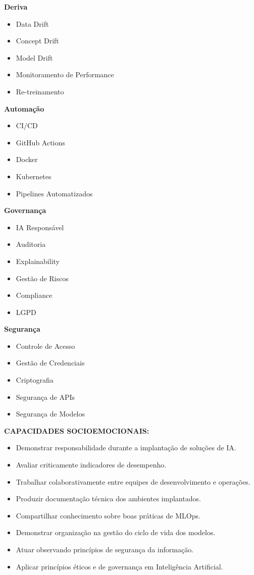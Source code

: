 \textbf{Deriva}

\begin{itemize}
\item Data Drift
\item Concept Drift
\item Model Drift
\item Monitoramento de Performance
\item Re-treinamento
\end{itemize}

\textbf{Automação}

\begin{itemize}
\item CI/CD
\item GitHub Actions
\item Docker
\item Kubernetes
\item Pipelines Automatizados
\end{itemize}

\textbf{Governança}

\begin{itemize}
\item IA Responsável
\item Auditoria
\item Explainability
\item Gestão de Riscos
\item Compliance
\item LGPD
\end{itemize}

\textbf{Segurança}

\begin{itemize}
\item Controle de Acesso
\item Gestão de Credenciais
\item Criptografia
\item Segurança de APIs
\item Segurança de Modelos
\end{itemize}

\textbf{CAPACIDADES SOCIOEMOCIONAIS:}

\begin{itemize}
\item Demonstrar responsabilidade durante a implantação de soluções de IA.
\item Avaliar criticamente indicadores de desempenho.
\item Trabalhar colaborativamente entre equipes de desenvolvimento e operações.
\item Produzir documentação técnica dos ambientes implantados.
\item Compartilhar conhecimento sobre boas práticas de MLOps.
\item Demonstrar organização na gestão do ciclo de vida dos modelos.
\item Atuar observando princípios de segurança da informação.
\item Aplicar princípios éticos e de governança em Inteligência Artificial.
\end{itemize}

